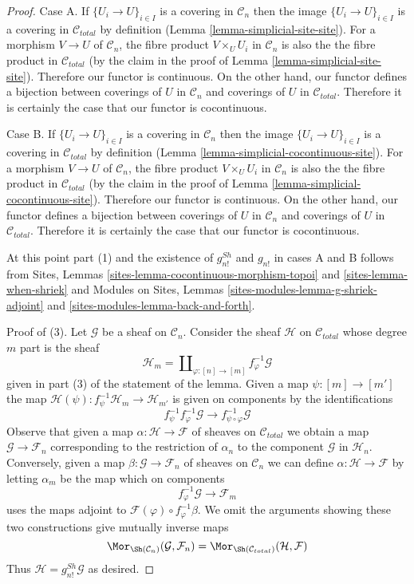 \begin{proof}
Case A. If $\{U_i \to U\}_{i \in I}$ is a covering in $\mathcal{C}_n$
then the image $\{U_i \to U\}_{i \in I}$ is a covering in $\mathcal{C}_{total}$
by definition (Lemma \ref{lemma-simplicial-site-site}). For a morphism
$V \to U$ of $\mathcal{C}_n$, the fibre product
$V \times_U U_i$ in $\mathcal{C}_n$ is also the
the fibre product in $\mathcal{C}_{total}$ (by the claim in the
proof of Lemma \ref{lemma-simplicial-site-site}).
Therefore our functor is continuous. On the other hand, our functor
defines a bijection between coverings of $U$ in $\mathcal{C}_n$
and coverings of $U$ in $\mathcal{C}_{total}$. Therefore it is
certainly the case that our functor is cocontinuous.

\medskip\noindent
Case B. If $\{U_i \to U\}_{i \in I}$ is a covering in $\mathcal{C}_n$
then the image $\{U_i \to U\}_{i \in I}$ is a covering in $\mathcal{C}_{total}$
by definition (Lemma \ref{lemma-simplicial-cocontinuous-site}). For a morphism
$V \to U$ of $\mathcal{C}_n$, the fibre product
$V \times_U U_i$ in $\mathcal{C}_n$ is also the
the fibre product in $\mathcal{C}_{total}$ (by the claim in the
proof of Lemma \ref{lemma-simplicial-cocontinuous-site}).
Therefore our functor is continuous. On the other hand, our functor
defines a bijection between coverings of $U$ in $\mathcal{C}_n$
and coverings of $U$ in $\mathcal{C}_{total}$. Therefore it is
certainly the case that our functor is cocontinuous.

\medskip\noindent
At this point part (1) and the existence of $g^{Sh}_{n!}$ and $g_{n!}$
in cases A and B follows from
Sites, Lemmas \ref{sites-lemma-cocontinuous-morphism-topoi} and
\ref{sites-lemma-when-shriek}
and
Modules on Sites, Lemmas \ref{sites-modules-lemma-g-shriek-adjoint} and
\ref{sites-modules-lemma-back-and-forth}.

\medskip\noindent
Proof of (3). Let $\mathcal{G}$ be a sheaf on $\mathcal{C}_n$.
Consider the sheaf $\mathcal{H}$ on $\mathcal{C}_{total}$
whose degree $m$ part is the sheaf
$$
\mathcal{H}_m = \coprod\nolimits_{\varphi : [n] \to [m]}
f_\varphi^{-1}\mathcal{G}
$$
given in part (3) of the statement of the lemma.
Given a map $\psi : [m] \to [m']$ the map
$\mathcal{H}(\psi) : f_\psi^{-1}\mathcal{H}_m \to \mathcal{H}_{m'}$
is given on components by the identifications
$$
f_\psi^{-1} f_\varphi^{-1} \mathcal{G} \to
f_{\psi \circ \varphi}^{-1}\mathcal{G}
$$
Observe that given a map $\alpha : \mathcal{H} \to \mathcal{F}$
of sheaves on $\mathcal{C}_{total}$ we obtain a map
$\mathcal{G} \to \mathcal{F}_n$
corresponding to the restriction of $\alpha_n$ to the component
$\mathcal{G}$ in $\mathcal{H}_n$. Conversely, given a map
$\beta : \mathcal{G} \to \mathcal{F}_n$ of sheaves on $\mathcal{C}_n$
we can define
$\alpha : \mathcal{H} \to \mathcal{F}$ by letting $\alpha_m$
be the map which on components
$$
f_\varphi^{-1}\mathcal{G} \to \mathcal{F}_m
$$
uses the maps adjoint to $\mathcal{F}(\varphi) \circ f_\varphi^{-1}\beta$.
We omit the arguments showing these two constructions give
mutually inverse maps
$$
\Mor_{\Sh(\mathcal{C}_n)}(\mathcal{G}, \mathcal{F}_n) =
\Mor_{\Sh(\mathcal{C}_{total})}(\mathcal{H}, \mathcal{F})
$$
Thus $\mathcal{H} = g^{Sh}_{n!}\mathcal{G}$ as desired.


\end{proof}
